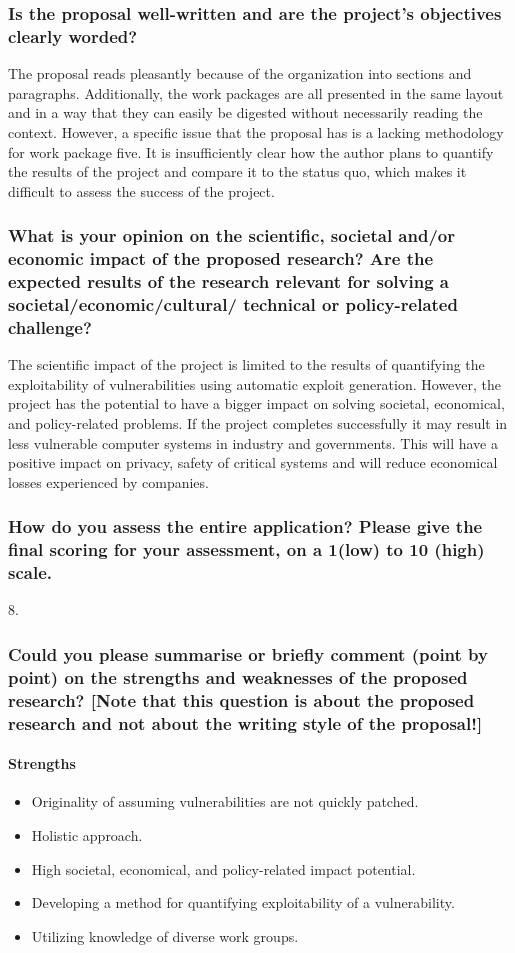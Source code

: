 \subsubsection*{Is the proposal well-written and are the project’s objectives clearly worded?}
The proposal reads pleasantly because of the organization into sections and paragraphs. Additionally, the work packages are all presented in the same layout and in a way that they can easily be digested without necessarily reading the context. However, a specific issue that the proposal has is a lacking methodology for work package five. It is insufficiently clear how the author plans to quantify the results of the project and compare it to the status quo, which makes it difficult to assess the success of the project.

\subsubsection*{What is your opinion on the scientific, societal and/or economic impact of the proposed research? Are the expected results of the research relevant for solving a societal/economic/cultural/ technical or policy-related challenge?}
The scientific impact of the project is limited to the results of quantifying the exploitability of vulnerabilities using automatic exploit generation. However, the project has the potential to have a bigger impact on solving societal, economical, and policy-related problems. If the project completes successfully it may result in less vulnerable computer systems in industry and governments. This will have a positive impact on privacy, safety of critical systems and will reduce economical losses experienced by companies.

\subsubsection*{How do you assess the entire application? Please give the final scoring for your assessment, on a 1(low) to 10 (high) scale.}
8.

\subsubsection*{Could you please summarise or briefly comment (point by point) on the strengths and weaknesses of the proposed research? [Note that this question is about the proposed research and not about the writing style of the proposal!]}
\paragraph{Strengths}
\begin{itemize}
    \item Originality of assuming vulnerabilities are not quickly patched.
    \item Holistic approach.
    \item High societal, economical, and policy-related impact potential.
    \item Developing a method for quantifying exploitability of a vulnerability.
    \item Utilizing knowledge of diverse work groups.
\end{itemize}

